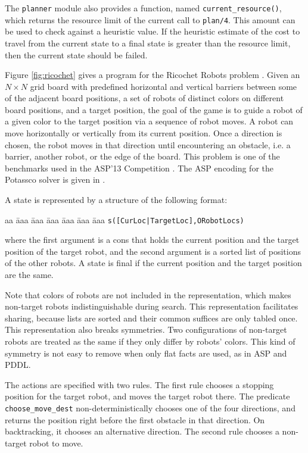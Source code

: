 \documentclass{new_tlp}
\begin{document}
The {\tt planner} module also provides a function, named {\tt current\_resource()}, which returns the resource limit of the current call to {\tt plan/4}. This amount can be used to check against a heuristic value. If the heuristic estimate of the cost to travel from the current state to a final state is greater than the resource limit, then the current state should be failed.

Figure \ref{fig:ricochet} gives a program for the Ricochet Robots problem \cite{ButoLR05}. Given an $N\times N$ grid board with predefined horizontal and vertical barriers between some of the adjacent board positions, a set of robots of distinct colors on different board positions, and a target position, the goal of the game is to guide a robot of a given color to the target position via a sequence of robot moves. A robot can move horizontally or vertically from its current position. Once a direction is chosen, the robot moves in that direction until encountering an obstacle, i.e. a barrier, another robot, or the edge of the board. This problem is one of the benchmarks used in the ASP'13 Competition \cite{ASP13}. The ASP encoding for the Potassco solver is given in \cite{Gebser13}.

A state is represented by a structure of the following format: 
\begin{tabbing}
aa \= aaa \= aaa \= aaa \= aaa \= aaa \= aaa \kill
\> \> {\tt s([CurLoc|TargetLoc],ORobotLocs)}
\end{tabbing}
where the first argument is a cons that holds the current position and the target position of the target robot, and the second argument is a sorted list of positions of the other robots. A state is final if the current position and the target position are the same. 

Note that colors of robots are not included in the representation, which makes non-target robots indistinguishable during search. This representation facilitates sharing, because lists are sorted and their common suffices are only tabled once. This representation also breaks symmetries. Two configurations of non-target robots are treated as the same if they only differ by robots' colors. This kind of symmetry is not easy to remove when only flat facts are used, as in ASP and PDDL.

The actions are specified with two rules. The first rule chooses a stopping position for the target robot, and moves the target robot there. The predicate {\tt choose\_move\_dest} non-deterministically chooses one of the four directions, and returns the position right before the first obstacle in that direction. On backtracking, it chooses an alternative direction. The second rule chooses a non-target robot to move. 
\end{document}
